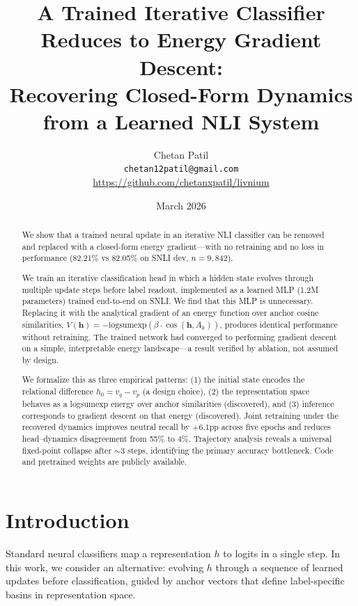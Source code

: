\documentclass[11pt]{article}
\title{A Trained Iterative Classifier Reduces to Energy Gradient Descent:\\Recovering Closed-Form Dynamics from a Learned NLI System}
\author{
    Chetan Patil \\
    \texttt{chetan12patil@gmail.com} \\
    \url{https://github.com/chetanxpatil/livnium}
}
\date{March 2026}
\newcommand{\vech}{\bm{h}}
\newcommand{\anchor}[1]{A_{#1}}
\newcommand{\lse}{\mathrm{logsumexp}}
\begin{document}
\maketitle

\begin{abstract}
We show that a trained neural update in an iterative NLI classifier
can be removed and replaced with a closed-form energy gradient---with
no retraining and no loss in performance (82.21\% vs 82.05\% on SNLI
dev, $n=9{,}842$).

We train an iterative classification head in which a hidden state
evolves through multiple update steps before label readout, implemented
as a learned MLP (1.2M parameters) trained end-to-end on SNLI.
We find that this MLP is unnecessary. Replacing it with the analytical
gradient of an energy function over anchor cosine similarities,
$V(\vech) = -\lse(\beta \cdot \cos(\vech, \anchor{k}))$,
produces identical performance without retraining. The trained
network had converged to performing gradient descent on a simple,
interpretable energy landscape---a result verified by ablation, not
assumed by design.

We formalize this as three empirical patterns: (1) the initial state
encodes the relational difference $h_0 = v_q - v_p$ (a design choice),
(2) the representation space behaves as a logsumexp energy over anchor
similarities (discovered), and (3) inference corresponds to gradient
descent on that energy (discovered). Joint retraining under the
recovered dynamics improves neutral recall by $+6.1$pp across five
epochs and reduces head--dynamics disagreement from 55\% to 4\%.
Trajectory analysis reveals a universal fixed-point collapse after
${\sim}3$ steps, identifying the primary accuracy bottleneck.
Code and pretrained weights are publicly available.
\end{abstract}

\section{Introduction}
\label{sec:intro}

Standard neural classifiers map a representation $h$ to logits in a
single step. In this work, we consider an alternative: evolving $h$
through a sequence of learned updates before classification, guided by
anchor vectors that define label-specific basins in representation space.
\end{document}
